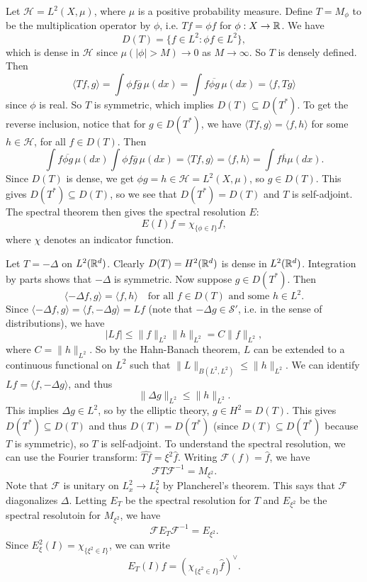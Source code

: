 \begin{example}
  Let $\mathcal{H} = L^2(X, \mu)$, where $\mu$ is a positive
  probability measure. Define $T = M_\phi$ to be the
  multiplication operator by $\phi$, i.e.
  $Tf = \phi f$ for $\phi : X \to \mathbb{R}$. We have
  \[
    D(T) = \{f \in L^2 : \phi f \in L^2\},
  \]
  which is dense in $\mathcal{H}$ since
  $\mu(|\phi| > M) \to 0$ as $M \to \infty$. So $T$ is
  densely defined. Then
  \[
    \langle Tf, g \rangle
    = \int \phi f \overline{g}\, \mu(dx)
    = \int f \overline{\phi g}\, \mu(dx)
    = \langle f, Tg \rangle
  \]
  since $\phi$ is real. So $T$ is symmetric, which implies
  $D(T) \subseteq D(T^*)$. To get the
  reverse inclusion, notice that for $g \in D(T^*)$, we have
  $\langle Tf, g \rangle = \langle f, h \rangle$ for
  some $h \in \mathcal{H}$, for all $f \in D(T)$. Then
  \[
    \int f \overline{\phi g}\, \mu(dx)
    \int \phi f \overline{g}\, \mu(dx)
    = \langle Tf, g \rangle
    = \langle f, h \rangle
    = \int f\overline{h} \mu(dx).
  \]
  Since $D(T)$ is dense, we get $\phi g = h \in \mathcal{H} = L^2(X, \mu)$, so
  $g \in D(T)$.
  This gives $D(T^*) \subseteq D(T)$, so we see that
  $D(T^*) = D(T)$ and $T$ is self-adjoint.
  The spectral theorem then gives the spectral resolution
  $E$:
  \[
    E(I) f = \chi_{\{\phi \in I\}} f,
  \]
  where $\chi$ denotes an indicator function.
\end{example}

\begin{example}
  Let $T = -\Delta$ on $L^2(\mathbb{R}^d)$. Clearly
  $D(T) = H^2(\mathbb{R}^d)$ is dense in $L^2(\mathbb{R}^d)$. Integration
  by parts shows that $-\Delta$ is symmetric.
  Now suppose $g \in D(T^*)$. Then
  \[
    \langle -\Delta f, g \rangle
    = \langle f, h \rangle \quad \text{for all $f \in D(T)$ and some $h \in L^2$}.
  \]
  Since
  $\langle -\Delta f, g \rangle = \langle f, -\Delta g \rangle = L f$
  (note that $-\Delta g \in \mathcal{S}'$, i.e. in the
  sense of distributions), we have
  \[
    |Lf| \le \|f \|_{L^2} \| h \|_{L^2}
    = C \|f \|_{L^2},
  \]
  where $C = \| h \|_{L^2}$. So by the Hahn-Banach
  theorem, $L$ can be extended to a continuous functional
  on $L^2$ such that $\|L\|_{B(L^2, L^2)} \le \|h \|_{L^2}$.
  We can identify  $Lf = \langle f, -\Delta g \rangle$, and thus
  \[
    \|\Delta g\|_{L^2} \le \|h \|_{L^2}.
  \]
  This implies $\Delta g \in L^2$, so by the elliptic theory,
  $g \in H^2 = D(T)$. This gives
  $D(T^*) \subseteq D(T)$ and thus $D(T) = D(T^*)$ (since
  $D(T) \subseteq D(T^*)$ because $T$ is symmetric), so
  $T$ is self-adjoint. To understand the spectral
  resolution, we can use the Fourier transform:
  $\widehat{Tf} = \xi^2 \widehat{f}$. Writing
  $\mathcal{F}(f) = \widehat{f}$, we have
  \[
    \mathcal{F} T \mathcal{F}^{-1} = M_{\xi^2}.
  \]
  Note that $\mathcal{F}$ is unitary on $L^2_x \to L^2_\xi$ by
  Plancherel's theorem. This says that $\mathcal{F}$
  diagonalizes $\Delta$. Letting $E_T$ be the
  spectral resolution for $T$ and $E_{\xi^2}$ be the
  spectral resolutoin for $M_{\xi^2}$, we have
  \[
    \mathcal{F} E_T \mathcal{F}^{-1} = E_{\xi^2}.
  \]
  Since $E_{\xi}^2(I) = \chi_{\{\xi^2 \in I\}}$, we can write
  \[
    E_T(I) f = (\chi_{\{\xi^2 \in I\}} \widehat{f})^\vee.
  \]
\end{example}

